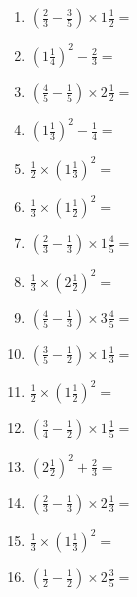 \documentclass[12pt]{article}
\begin{document}
\begin{enumerate}
\item \large $ \left( \frac{2}{3} - \frac{3}{5} \right) \times 1 \frac{1}{2} = $ \vspace{1.6cm}
\newpage
\item \large $ \left( 1 \frac{1}{4} \right)^2 - \frac{2}{3} = $ \vspace{1.6cm}
\item \large $ \left( \frac{4}{5} - \frac{1}{5} \right) \times 2 \frac{1}{2} = $ \vspace{1.6cm}
\item \large $ \left( 1 \frac{1}{3} \right)^2 - \frac{1}{4} = $ \vspace{1.6cm}
\item \large $ \frac{1}{2} \times \left( 1 \frac{1}{3} \right)^2 = $ \vspace{1.6cm}
\item \large $ \frac{1}{3} \times \left( 1 \frac{1}{2} \right)^2 = $ \vspace{1.6cm}
\item \large $ \left( \frac{2}{3} - \frac{1}{3} \right) \times 1 \frac{4}{5} = $ \vspace{1.6cm}
\item \large $ \frac{1}{3} \times \left( 2 \frac{1}{2} \right)^2 = $ \vspace{1.6cm}
\item \large $ \left( \frac{4}{5} - \frac{1}{3} \right) \times 3 \frac{4}{5} = $ \vspace{1.6cm}
\item \large $ \left( \frac{3}{5} - \frac{1}{2} \right) \times 1 \frac{1}{3} = $ \vspace{1.6cm}
\item \large $ \frac{1}{2} \times \left( 1 \frac{1}{2} \right)^2 = $ \vspace{1.6cm}
\newpage
\item \large $ \left( \frac{3}{4} - \frac{1}{2} \right) \times 1 \frac{1}{5} = $ \vspace{1.6cm}
\item \large $ \left( 2 \frac{1}{2} \right)^2 + \frac{2}{3} = $ \vspace{1.6cm}
\item \large $ \left( \frac{2}{3} - \frac{1}{3} \right) \times 2 \frac{1}{3} = $ \vspace{1.6cm}
\item \large $ \frac{1}{3} \times \left( 1 \frac{1}{3} \right)^2 = $ \vspace{1.6cm}
\item \large $ \left( \frac{1}{2} - \frac{1}{2} \right) \times 2 \frac{3}{5} = $ \vspace{1.6cm}

\end{enumerate}
\end{document}
